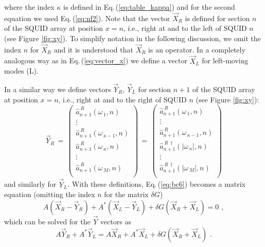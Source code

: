 %
where the index $\kappa$ is defined in Eq.\,(\ref{eq:table_kappa}) and for the second equation we used
Eq.\,(\ref{eq:nf2}). 
Note that the vector $\vec{X}_R$ is defined for section $n$ of the SQUID array at position $x=n$, i.e.,
right at and to the left of SQUID $n$ (see Figure \ref{fig:xy}).
%
To simplify notation in the following discussion, we omit the index $n$ for $\vec{X}_R$ and it is 
understood that $\vec{X}_R$ is an operator. 
In a completely analogous way as in Eq.\,(\ref{eq:vector_x}) we define a vector $\vec{X}_L$ for 
left-moving modes (L). 

In a similar way we define vectors $\vec{Y}_R$, $\vec{Y}_L$
for section $n+1$ of the SQUID array at position $x=n$, i.e., right at and to the right of SQUID $n$ 
(see Figure \ref{fig:xy}):
%
\begin{equation} \label{eq:vector_y}
\vec{Y}_R \, = \, 
\begin{pmatrix}
\hat{a}_{n+1}^{\,R}(\omega_{\,1},n) \\
\vdots \\
\hat{a}_{n+1}^{\,R}(\omega_{\,\kappa-1},n) \\
\hat{a}_{n+1}^{\,R}(\omega_{\,\kappa},n) \\
\vdots \\
\hat{a}_{n+1}^{\,R}(\omega_{\,M},n) \\
\end{pmatrix}
\, = \,
\begin{pmatrix}
\hat{a}_{n+1}^{\,R}(\omega_{\,1},n) \\
\vdots \\
\hat{a}_{n+1}^{\,R}(\omega_{\,\kappa-1},n) \\
\hat{a}_{n+1}^{\,R\,\dagger}(|\omega_{\,\kappa}|,n) \\
\vdots \\
\hat{a}_{n+1}^{\,R\,\dagger}(|\omega_{\,M}|,n) \\
\end{pmatrix}
\end{equation}
%
and similarly for $\vec{Y}_L$. With these definitions, Eq.\,(\ref{eq:bc6}) becomes a matrix equation
(omitting the index $n$ for the matrix $\delta G$)
%
\begin{equation} \label{eq:bc7}
A \left(\vec{X}_R - \vec{Y}_R \right) + A^* \left(\vec{X}_L - \vec{Y}_L \right) + 
\delta G \left(\vec{X}_R + \vec{X}_L \right) = 0 \, \, ,
\end{equation} 
%
which can be solved for the $\vec{Y}$ vectors as
%
\begin{equation} \label{eq:bc8}
A \vec{Y}_R + A^* \vec{Y}_L =
A \vec{X}_R + A^* \vec{X}_L + \delta G \left(\vec{X}_R + \vec{X}_L \right) \, \, .
\end{equation}
